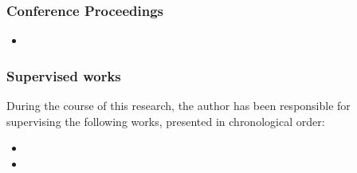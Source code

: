 \documentclass[main.tex]{subfiles}
\begin{document}
\subsubsection{Conference Proceedings}
\begin{itemize}
	\item {}
\end{itemize} 

\subsubsection{Supervised works}
During the course of this research, the author has been responsible for supervising the following works, presented in chronological order:

\begin{itemize}
	\item {} %
	\item {} %
\end{itemize}	
\end{document}

